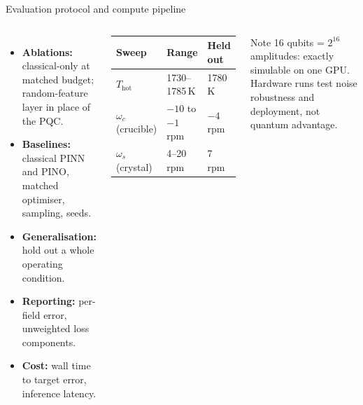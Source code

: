 \documentclass[aspectratio=169,10pt]{beamer}
\begin{document}
\begin{frame}{Evaluation protocol and compute pipeline}
\begin{columns}[T,onlytextwidth]
\begin{itemize}\footnotesize\setlength{\itemsep}{1pt}
  \item \textbf{Ablations:} classical-only at matched budget; random-feature layer in place of the PQC.
  \item \textbf{Baselines:} classical PINN and PINO, matched optimiser, sampling, seeds.
  \item \textbf{Generalisation:} hold out a whole operating condition.
  \item \textbf{Reporting:} per-field error, unweighted loss components.
  \item \textbf{Cost:} wall time to target error, inference latency.
\end{itemize}
\begin{center}
\footnotesize
\begin{tabular}{lll}
\toprule
Sweep & Range & Held out \\
\midrule
$T_{\mathrm{hot}}$ & 1730--1785\,K & 1780\,K \\
$\omega_c$ (crucible) & $-10$ to $-1$ rpm & $-4$ rpm \\
$\omega_s$ (crystal) & 4--20 rpm & 7 rpm \\
\bottomrule
\end{tabular}
\end{center}
\centering
{}
\vspace{0.1cm}
\begin{block}{Note}
\scriptsize 16 qubits = $2^{16}$ amplitudes: exactly simulable on one GPU. Hardware runs test noise robustness and deployment, not quantum advantage.
\end{block}
\end{columns}
\end{frame}
\end{document}
